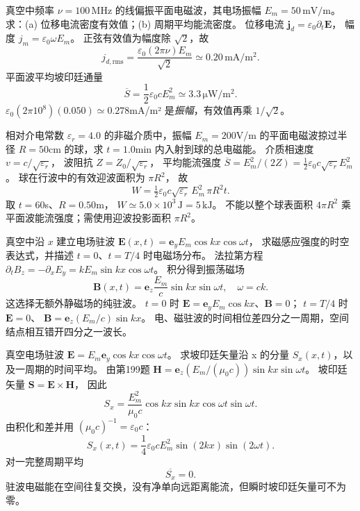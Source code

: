 真空中频率 $\nu=100\,\mathrm{MHz}$ 的线偏振平面电磁波，其电场振幅 $E_m=50\,\mathrm{mV/m}$。求：(a) 位移电流密度有效值；(b) 周期平均能流密度。
\exsolution
位移电流
$\bm j_d=\varepsilon_0\partial_t\bm E$，
幅度
$j_m=\varepsilon_0\omega E_m$。
正弦有效值为幅度除 $\sqrt2$，故
\[
\boxed{j_{d,\mathrm{rms}}=
\frac{\varepsilon_0(2\pi\nu)E_m}{\sqrt2}
\simeq0.20\,\mathrm{mA/m^2}}.
\]
平面波平均坡印廷通量
\[
\boxed{\overline S=
\frac12\varepsilon_0cE_m^2
\simeq3.3\,\mathrm{\mu W/m^2}}.
\]
\excheck $\varepsilon_0(2\pi10^8)(0.050)\simeq0.278$mA/m² 是\emph{振幅}，有效值再乘 $1/\sqrt2$。

相对介电常数 $\varepsilon_r=4.0$ 的非磁介质中，振幅 $E_m=200$V/m 的平面电磁波掠过半径 $R=50$cm 的球，求 $t=1.0$min 内入射到球的总电磁能。
\exsolution
介质相速度 $v=c/\sqrt{\varepsilon_r}$，
波阻抗 $Z=Z_0/\sqrt{\varepsilon_r}$，
平均能流强度
$\overline S=E_m^2/(2Z)
=\tfrac12\varepsilon_0c\sqrt{\varepsilon_r}E_m^2$。
球在行波中的有效迎波面积为 $\pi R^2$，
故
\[
\boxed{W=\tfrac12\varepsilon_0c\sqrt{\varepsilon_r}\,
E_m^2\,\pi R^2t}.
\]
取 $t=60$s、$R=0.50$m，
$\boxed{W\simeq5.0\times10^3\,\mathrm J=5\,\mathrm{kJ}}$。
\excheck 不能以整个球表面积 $4\pi R^2$ 乘平面波能流强度；需使用迎波投影面积 $\pi R^2$。

真空中沿 $x$ 建立电场驻波
$\bm E(x,t)=\bm e_yE_m\cos kx\cos\omega t$，
求磁感应强度的时空表达式，并描述
$t=0$、$t=T/4$ 时电磁场分布。
\exsolution
法拉第方程
$\partial_tB_z=-\partial_xE_y
=kE_m\sin kx\cos\omega t$。
积分得到振荡磁场
\[
\boxed{\bm B(x,t)=\bm e_z\frac{E_m}{c}
\sin kx\sin\omega t},
\quad \omega=ck.
\]
这选择无额外静磁场的纯驻波。
$t=0$ 时
$\bm E=\bm e_yE_m\cos kx$、$\bm B=0$；
$t=T/4$ 时 $\bm E=0$、
$\bm B=\bm e_z(E_m/c)\sin kx$。
\excheck 电、磁驻波的时间相位差四分之一周期，空间结点相互错开四分之一波长。

真空电场驻波
$\bm E=E_m\bm e_y\cos kx\cos\omega t$。
求坡印廷矢量沿 x 的分量 $S_x(x,t)$，以及一周期的时间平均。
\exsolution
由第199题
$\bm H=\bm e_z(E_m/(\mu_0c))\sin kx\sin\omega t$。
坡印廷矢量
$\bm S=\bm E\times\bm H$，
因此
\[
S_x=
\frac{E_m^2}{\mu_0c}
\cos kx\sin kx\cos\omega t\sin\omega t.
\]
由积化和差并用 $(\mu_0c)^{-1}=\varepsilon_0c$：
\[
\boxed{S_x(x,t)=
\frac14\varepsilon_0cE_m^2\sin(2kx)\sin(2\omega t)}.
\]
对一完整周期平均
\[
\boxed{\overline{S_x}=0}.
\]
\excheck 驻波电磁能在空间往复交换，没有净单向远距离能流，但瞬时坡印廷矢量可不为零。
